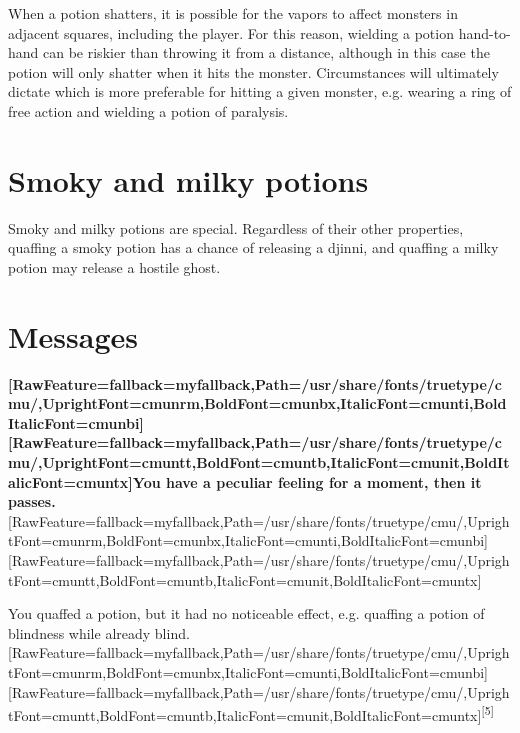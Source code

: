 When a potion shatters, it is possible for the vapors to affect monsters in adjacent squares, including the player. For this reason, wielding a potion hand-{}to-{}hand can be riskier than throwing it from a distance, although in this case the potion will only shatter when it hits the monster. Circumstances will ultimately dictate which is more preferable for hitting a given monster, e.g. wearing a ring of free action\footnotemark[251] and wielding a potion of paralysis.



\section{Smoky and milky potions}
\label{14}
Smoky and milky potions\footnotemark[252] are special.  Regardless of their other properties, quaffing\footnotemark[253] a smoky potion has a chance of releasing a djinni\footnotemark[254], and quaffing a milky potion may release a hostile ghost\footnotemark[255].



\section{Messages}
\label{15}
{\bfseries \allowbreak{}\setmainfont{cmunbx.ttf}[RawFeature={fallback=myfallback},Path=/usr/share/fonts/truetype/cmu/,UprightFont=cmunrm,BoldFont=cmunbx,ItalicFont=cmunti,BoldItalicFont=cmunbi]\setmonofont{cmunbx.ttf}[RawFeature={fallback=myfallback},Path=/usr/share/fonts/truetype/cmu/,UprightFont=cmuntt,BoldFont=cmuntb,ItalicFont=cmunit,BoldItalicFont=cmuntx]\bfseries You have a peculiar feeling for a moment, then it passes.}\allowbreak{}\setmainfont{cmunrm.ttf}[RawFeature={fallback=myfallback},Path=/usr/share/fonts/truetype/cmu/,UprightFont=cmunrm,BoldFont=cmunbx,ItalicFont=cmunti,BoldItalicFont=cmunbi]\setmonofont{cmunrm.ttf}[RawFeature={fallback=myfallback},Path=/usr/share/fonts/truetype/cmu/,UprightFont=cmuntt,BoldFont=cmuntb,ItalicFont=cmunit,BoldItalicFont=cmuntx]

\begin{myquote}
\item{}You quaffed a potion, but it had no noticeable effect, e.g. quaffing a potion of blindness while already blind\footnotemark[256].\allowbreak{}\setmainfont{cmunrm.ttf}[RawFeature={fallback=myfallback},Path=/usr/share/fonts/truetype/cmu/,UprightFont=cmunrm,BoldFont=cmunbx,ItalicFont=cmunti,BoldItalicFont=cmunbi]\setmonofont{cmunrm.ttf}[RawFeature={fallback=myfallback},Path=/usr/share/fonts/truetype/cmu/,UprightFont=cmuntt,BoldFont=cmuntb,ItalicFont=cmunit,BoldItalicFont=cmuntx]\textsuperscript{{$\text{[}$}5{$\text{]}$}}
\end{myquote}

